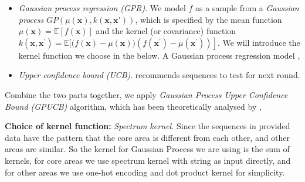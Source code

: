 \begin{itemize}
    \item \textit{Gaussian process regression (GPR)}. We model $f$ as a sample from a \textit{Gaussian process} $GP(\mu(\mathbf{x}), k(\mathbf{x}, \mathbf{x'}))$, which is specified by the mean function $\mu(\mathbf{x})=\mathbb{E}[f(\mathbf{x})]$ and the kernel (or covariance) function $k\left(\mathbf{x}, \mathbf{x}^{\prime}\right)=\mathbb{E}[(f(\mathbf{x})-\left.\mu(\mathbf{x}))\left(f\left(\mathbf{x}^{\prime}\right)-\mu\left(\mathbf{x}^{\prime}\right)\right)\right]$. We will introduce the kernel function we choose in the below. 
    A Gaussian process regression model \cite{Rasmussen2004}, 
    
    \item \textit{Upper confidence bound (UCB)}. recommends sequences to test for next round.
\end{itemize}

Combine the two parts together, we apply \textit{Gaussian Process Upper Confidence Bound (GPUCB)} algorithm, which has been theoretically analysed by \textcite{srinivas2012information}, 

\textbf{Choice of kernel function:} \textit{Spectrum kernel.} Since the sequences in provided data have the pattern that the core area is different from each other, and other areas are similar. So the kernel for Gaussian Process we are using is the sum of kernels, for core areas we use spectrum kernel with string as input directly, and for other areas we use one-hot encoding and dot product kernel for simplicity.
